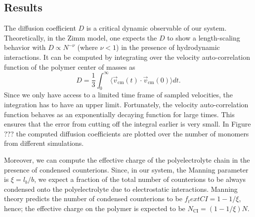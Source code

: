 \subsection{Results}
The diffusion coefficient $D$ is a critical dynamic observable of our system. Theoretically, in the Zimm model, one expects the $D$ to show a length-scaling behavior with $D \propto N^{-\nu}$ (where $\nu < 1$) in the presence of hydrodynamic interactions. It can be computed by integrating over the velocity auto-correlation  function of the polymer center of masses as
\begin{equation}
	D = \frac{1}{3} \int_{0}^{\infty} \langle \vec{v}_\text{cm}(t) \cdot \vec{v}_\text{cm}(0) \rangle dt.
\end{equation}
Since we only have access to a limited time frame of sampled velocities, the integration has to have an upper limit. Fortunately, the velocity auto-correlation function behaves as an exponentially decaying function for large times. This ensures that the error from cutting off the integral earlier is very small. In Figure ??? the computed diffusion coefficients are plotted over the number of monomers from different simulations.

Moreover, we can compute the effective charge of the polyelectrolyte chain in the presence of condensed counterions. Since, in our system, the Manning parameter is $\xi = l_b / b$, we expect a fraction of the total number of counterions to be always condensed onto the polyelectrolyte due to electrostatic interactions. Manning theory predicts the number of condensed counterions to be $f_text{CI} = 1 - 1/\xi$, hence; the effective charge on the polymer is expected to be $N_\text{CI} = (1-1/\xi)N$.